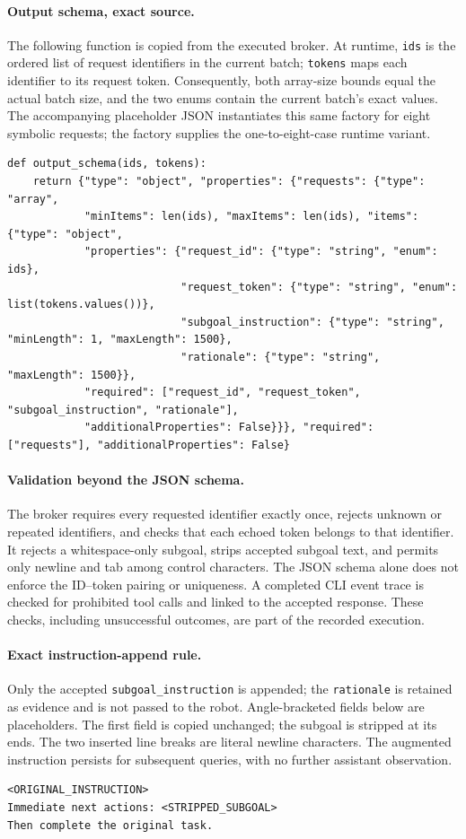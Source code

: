 \paragraph{Output schema, exact source.}
The following function is copied from the executed broker. At runtime, \texttt{ids} is the ordered list of request identifiers in the current batch; \texttt{tokens} maps each identifier to its request token. Consequently, both array-size bounds equal the actual batch size, and the two enums contain the current batch's exact values. The accompanying placeholder JSON instantiates this same factory for eight symbolic requests; the factory supplies the one-to-eight-case runtime variant.
\begingroup\footnotesize
\begin{verbatim}
def output_schema(ids, tokens):
    return {"type": "object", "properties": {"requests": {"type": "array",
            "minItems": len(ids), "maxItems": len(ids), "items": {"type": "object",
            "properties": {"request_id": {"type": "string", "enum": ids},
                           "request_token": {"type": "string", "enum": list(tokens.values())},
                           "subgoal_instruction": {"type": "string", "minLength": 1, "maxLength": 1500},
                           "rationale": {"type": "string", "maxLength": 1500}},
            "required": ["request_id", "request_token", "subgoal_instruction", "rationale"],
            "additionalProperties": False}}}, "required": ["requests"], "additionalProperties": False}
\end{verbatim}
\endgroup
\paragraph{Validation beyond the JSON schema.}
The broker requires every requested identifier exactly once, rejects unknown or repeated identifiers, and checks that each echoed token belongs to that identifier. It rejects a whitespace-only subgoal, strips accepted subgoal text, and permits only newline and tab among control characters. The JSON schema alone does not enforce the ID--token pairing or uniqueness. A completed CLI event trace is checked for prohibited tool calls and linked to the accepted response. These checks, including unsuccessful outcomes, are part of the recorded execution.

\paragraph{Exact instruction-append rule.}
Only the accepted \texttt{subgoal\_instruction} is appended; the \texttt{rationale} is retained as evidence and is not passed to the robot. Angle-bracketed fields below are placeholders. The first field is copied unchanged; the subgoal is stripped at its ends. The two inserted line breaks are literal newline characters. The augmented instruction persists for subsequent queries, with no further assistant observation.
\begingroup\small
\begin{verbatim}
<ORIGINAL_INSTRUCTION>
Immediate next actions: <STRIPPED_SUBGOAL>
Then complete the original task.
\end{verbatim}
\endgroup

